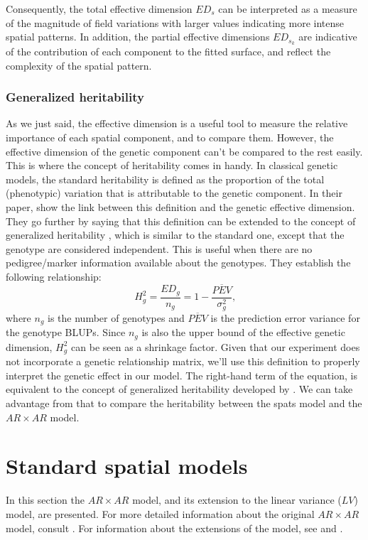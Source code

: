 Consequently, the total effective dimension $ED_{s}$ can be interpreted as a measure of the magnitude of field variations with larger values indicating more intense spatial patterns. In addition, the partial effective dimensions $ED_{s_{k}}$ are indicative of the contribution of each component to the fitted surface, and reflect the complexity of the spatial pattern.

\subsubsection{Generalized heritability}
As we just said, the effective dimension is a useful tool to measure the relative importance of each spatial component, and to compare them. However, the effective dimension of the genetic component can't be compared to the rest easily. This is where the concept of heritability comes in handy. In classical genetic models, the standard heritability is defined as the proportion of the total (phenotypic) variation that is attributable to the genetic component. In their paper, \textcite{rodriguez-alvarez_correcting_2018} show the link between this definition and the genetic effective dimension. They go further by saying that this definition can be extended to the concept of generalized heritability \parencite{oakey_joint_2006}, which is similar to the standard one, except that the genotype are considered independent. This is useful when there are no pedigree/marker information available about the genotypes. They establish the following relationship:
\begin{equation}
H_{g}^2 = \dfrac{ED_{g}}{n_{g}} = 1 - \dfrac{\overline{PEV}}{\sigma^2_{g}}
\text{,}
\end{equation}
where $n_{g}$ is the number of genotypes and $\overline{PEV}$ is the prediction error variance for the genotype BLUPs. Since $n_{g}$ is also the upper bound of the effective genetic dimension, $H^2_{g}$ can be seen as a shrinkage factor. Given that our experiment does not incorporate a genetic relationship matrix, we'll use this definition to properly interpret the genetic effect in our model. The right-hand term of the equation, is equivalent to the concept of generalized heritability developed by \textcite{welham2010comparison}. We can take advantage from that to compare the heritability between the spats model and the $AR \times AR$ model.

\section{Standard spatial models}
\label{sec:arxar_model}
In this section the $AR \times AR$ model, and its extension to the linear variance ($LV$) model, are presented. For more detailed information about the original $AR \times AR$ model, consult \textcite{gilmour_accounting_1997}. For information about the extensions of the model, see \textcite{piepho_linear_2010} and \textcite{williams_neighbour_1986}.\\

